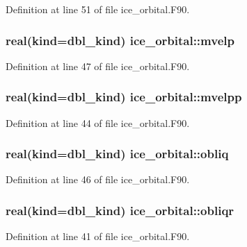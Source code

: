 Definition at line 51 of file ice\_\-orbital.F90.\hypertarget{namespaceice__orbital_a60cdda9eb0a01c43d7c74579bf173c35}{
\subsubsection[{mvelp}]{\setlength{\rightskip}{0pt plus 5cm}real(kind=dbl\_\-kind) {\bf ice\_\-orbital::mvelp}}}
\label{namespaceice__orbital_a60cdda9eb0a01c43d7c74579bf173c35}


Definition at line 47 of file ice\_\-orbital.F90.\hypertarget{namespaceice__orbital_ac06fd0600b7af9337b89ab60e896d2a1}{
\subsubsection[{mvelpp}]{\setlength{\rightskip}{0pt plus 5cm}real(kind=dbl\_\-kind) {\bf ice\_\-orbital::mvelpp}}}
\label{namespaceice__orbital_ac06fd0600b7af9337b89ab60e896d2a1}


Definition at line 44 of file ice\_\-orbital.F90.\hypertarget{namespaceice__orbital_ab9294c89b23f79319e267acbe36054ae}{
\subsubsection[{obliq}]{\setlength{\rightskip}{0pt plus 5cm}real(kind=dbl\_\-kind) {\bf ice\_\-orbital::obliq}}}
\label{namespaceice__orbital_ab9294c89b23f79319e267acbe36054ae}


Definition at line 46 of file ice\_\-orbital.F90.\hypertarget{namespaceice__orbital_a574192fd5a271f5addcbae852d673307}{
\subsubsection[{obliqr}]{\setlength{\rightskip}{0pt plus 5cm}real(kind=dbl\_\-kind) {\bf ice\_\-orbital::obliqr}}}
\label{namespaceice__orbital_a574192fd5a271f5addcbae852d673307}


Definition at line 41 of file ice\_\-orbital.F90.